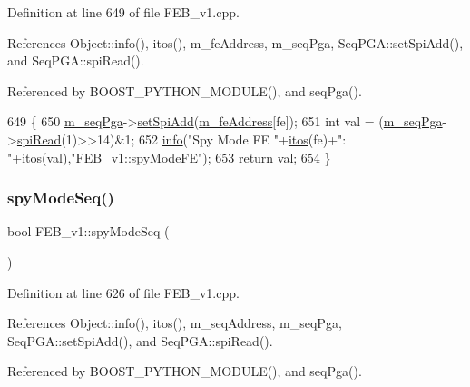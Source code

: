 Definition at line 649 of file F\+E\+B\+\_\+v1.\+cpp.



References Object\+::info(), itos(), m\+\_\+fe\+Address, m\+\_\+seq\+Pga, Seq\+P\+G\+A\+::set\+Spi\+Add(), and Seq\+P\+G\+A\+::spi\+Read().



Referenced by B\+O\+O\+S\+T\+\_\+\+P\+Y\+T\+H\+O\+N\+\_\+\+M\+O\+D\+U\+L\+E(), and seq\+Pga().


\begin{DoxyCode}
649                               \{
650   \hyperlink{classFEB__v1_a6c7804ac86796f233a8393043adf2e77}{m\_seqPga}->\hyperlink{classSeqPGA_ac998ce3a6d9b5f2e88cc8393f8c1df53}{setSpiAdd}(\hyperlink{classFEB__v1_a4e1945c2d5b434125f375e9d0fc6d99f}{m\_feAddress}[fe]);
651   \textcolor{keywordtype}{int} val = (\hyperlink{classFEB__v1_a6c7804ac86796f233a8393043adf2e77}{m\_seqPga}->\hyperlink{classSeqPGA_ab3d0e5e5d4014bc7a92588a76b8713d4}{spiRead}(1)>>14)&1;
652   \hyperlink{classObject_a644fd329ea4cb85f54fa6846484b84a8}{info}(\textcolor{stringliteral}{"Spy Mode FE "}+\hyperlink{Tools_8h_af330027dbdafb9a30768b3613c553e60}{itos}(fe)+\textcolor{stringliteral}{": "}+\hyperlink{Tools_8h_af330027dbdafb9a30768b3613c553e60}{itos}(val),\textcolor{stringliteral}{"FEB\_v1::spyModeFE"});
653   \textcolor{keywordflow}{return} val;
654 \}
\end{DoxyCode}
\mbox{\label{classFEB__v1_a3ec8b74aedfbe5e3d3ce0d4b4eb44330}} 
\subsubsection{\texorpdfstring{spy\+Mode\+Seq()}{spyModeSeq()}}
{\footnotesize\ttfamily bool F\+E\+B\+\_\+v1\+::spy\+Mode\+Seq (\begin{DoxyParamCaption}{ }\end{DoxyParamCaption})}



Definition at line 626 of file F\+E\+B\+\_\+v1.\+cpp.



References Object\+::info(), itos(), m\+\_\+seq\+Address, m\+\_\+seq\+Pga, Seq\+P\+G\+A\+::set\+Spi\+Add(), and Seq\+P\+G\+A\+::spi\+Read().



Referenced by B\+O\+O\+S\+T\+\_\+\+P\+Y\+T\+H\+O\+N\+\_\+\+M\+O\+D\+U\+L\+E(), and seq\+Pga().


